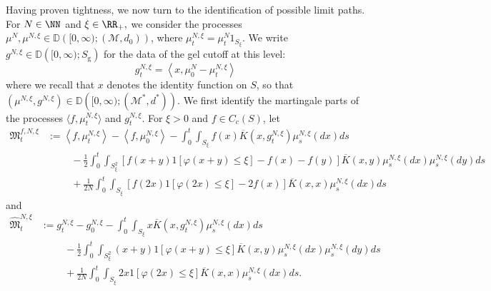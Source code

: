 Having proven tightness, we now turn to the identification of possible limit paths. For $N\in\NN$ and $\xi \in \RR_+,$ we consider the processes $\mu^N, \mu^{N,\xi} \in \mathbb{D}\left([0,\infty); \left(\mathcal{M}, d_0\right)\right)$, where
$\mu^{N,\xi}_t = \mu^N_t 1_{S_\xi}$. We write $g^{N,\xi} \in \mathbb{D}\left([0,\infty); S_\mathrm{g}\right)$ for the data of the gel cutoff at this level:
\begin{equation}\label{eq: cutoff gel} g^{N,\xi}_t = \left<x, \mu_0^N -\mu^{N,\xi}_t\right>\end{equation} where we recall that $x$ denotes the identity function on $S$, so that
$\left(\mu^{N,\xi}, g^{N,\xi}\right) \in \mathbb{D}\left([0,\infty); \left(\mathcal{M}^\ast, d^\ast\right)\right). $  
We first identify the martingale parts of  the processes $\langle f, \mu^{N,\xi}_t\rangle$ and $g^{N,\xi}_t$.
For $\xi >0$ and $f\in C_c(S)$, let
\begin{equation}\label{eq:mg1} \begin{split}
\mathfrak{M}_t^{f,N,\xi} &:= \left<f, \mu_t^{N,\xi}\right> - \left<f, \mu_0^{N,\xi}\right> 
- \int_0^t \int_{S_\xi}f(x) \overline{K}\left(x,g^{N,\xi}_t\right)\mu^{N,\xi}_s(d x)d s\\
&\hspace{1cm}- \frac12 \int_0^t \int_{S_\xi^2}\left[f(x+y)1[\varphi(x+y) \leq \xi ] - f(x) - f(y)\right]
      \overline{K}(x,y)\mu^{N,\xi}_s(d x)\mu^{N,\xi}_s(d y) ds \\
     & \hspace{1cm} + \frac{1}{2N}\int_0^t \int_{S_\xi} \left[f(2x)1[\varphi(2x) \leq \xi ] - 2f(x)\right]\overline{K}(x,x)\mu^{N,\xi}_s(d x) d s
\end{split}\end{equation}
and
\begin{equation}\label{eq:mg2} \begin{split}
\widehat{\mathfrak{M}}_t^{N,\xi} &:= g_t^{N,\xi} - g_0^{N,\xi} 
- \int_0^t \int_{S_\xi}x \overline{K}\left(x,g^{N,\xi}_t\right)\mu^{N,\xi}_s(d x)d s\\& \hspace{1cm}
- \frac12 \int_0^t \int_{S_\xi^2}(x+y)1[\varphi(x+y) \leq \xi ]
      \overline{K}(x,y)\mu^{N,\xi}_s(d x)\mu^{N,\xi}_s(d y) ds \\ &\hspace{1cm}
      + \frac{1}{2N}\int_0^t \int_{S_\xi} 2x 1[\varphi(2x) \leq \xi ]\overline{K}(x,x)\mu^{N,\xi}_s(d x) d s.
\end{split}\end{equation}


